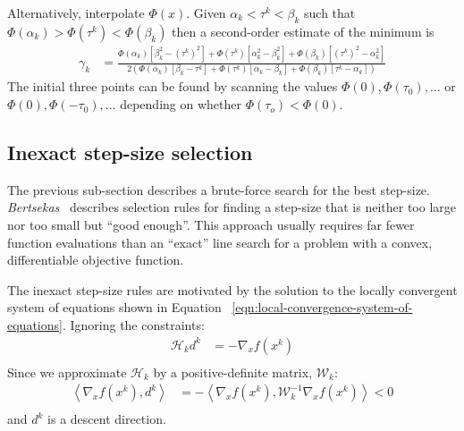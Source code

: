 \documentclass[a4paper,twoside,10pt,english]{report}
\begin{document}
Alternatively, interpolate $\Phi\left(x\right)$. Given 
$\alpha_{k}<\tau^{k}<\beta_{k}$
such that 
$\Phi\left(\alpha_{k}\right)>\Phi\left(\tau^{k}\right)<\Phi\left(\beta_{k}\right)$
then a second-order estimate of the minimum is 
\begin{align*}
\gamma_{k} &= \frac{\Phi\left(\alpha_{k}\right)\left[\beta_{k}^{2}-\left(\tau^{k}\right)^{2}\right]+\Phi\left(\tau^{k}\right)\left[\alpha_{k}^{2}-\beta_{k}^{2}\right]+\Phi\left(\beta_{k}\right)\left[\left(\tau^{k}\right)^{2}-\alpha_{k}^{2}\right]}{2\left(\Phi\left(\alpha_{k}\right)\left[\beta_{k}-\tau^{k}\right]+\Phi\left(\tau^{k}\right)\left[\alpha_{k}-\beta_{k}\right]+\Phi\left(\beta_{k}\right)\left[\tau^{k}-\alpha_{k}\right]\right)}
\end{align*}
The initial three points can be found by scanning the values $\Phi\left(0\right),\Phi\left(\tau_{0}\right),\ldots$
or $\Phi\left(0\right),\Phi\left(-\tau_{0}\right),\ldots$ depending
on whether $\Phi\left(\tau_{o}\right)<\Phi\left(0\right)$.

\subsection{\label{Inexact-step-size-selection}Inexact step-size selection}
The previous sub-section describes a brute-force search for the best
step-size. \emph{Bertsekas}~\cite[p. 28]{Bertsekas_NonlinearProgramming}
describes selection rules for finding a step-size that is neither
too large nor too small but ``good enough''. This approach usually
requires far fewer function evaluations than an ``exact'' line search 
for a problem with a convex, differentiable objective function.

The inexact step-size rules are motivated by the solution to the locally
convergent system of equations shown in Equation 
~\ref{eqn:local-convergence-system-of-equations}. Ignoring the constraints:
\begin{align*}
\mathcal{H}_{k}d^{k} &= -\nabla_{x}f\left(x^{k}\right)\\
\end{align*}
Since we approximate $\mathcal{H}_{k}$ by a positive-definite matrix, $\mathcal{W}_{k}$:
\begin{align*}
\left\langle \nabla_{x}f\left(x^{k}\right),d^{k} \right\rangle &=
-\left\langle \nabla_{x}f\left(x^{k}\right),
\mathcal{W}_{k}^{-1}\nabla_{x}f\left(x^{k}\right)\right\rangle  < 0\\
\end{align*}
and $d^{k}$ is a descent direction. 
\end{document}

